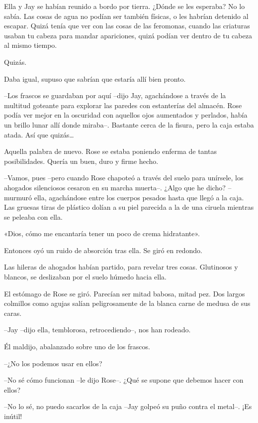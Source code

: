 {Ella y Jay se habían reunido a bordo por tierra. ¿Dónde se les
 esperaba? No lo sabía. Las cosas de agua no podían ser también físicas,
 o les habrían detenido al escapar. Quizá tenía que ver con las cosas de
 las feromonas, cuando las criaturas usaban tu cabeza para mandar
apariciones, quizá podían ver dentro de tu cabeza al mismo tiempo.}

{Quizás.}

{Daba igual, supuso que sabrían que estaría allí bien pronto.}

{--Los frascos se guardaban por aquí --dijo Jay, agachándose a través de
 la multitud goteante para explorar las paredes con estanterías del
 almacén. Rose podía ver mejor en la oscuridad con aquellos ojos
 aumentados y perlados, había un brillo lunar allí donde miraba--.
 Bastante cerca de la fisura, pero la caja estaba atada. Así que
 quizás\ldots{}}

{Aquella palabra de nuevo. Rose se estaba poniendo enferma de tantas
posibilidades. Quería un buen, duro y firme hecho.}

{--Vamos, pues --pero cuando Rose chapoteó a través del suelo para
 unírsele, los ahogados silenciosos cesaron en su marcha muerta--. ¿Algo
 que he dicho? --murmuró ella, agachándose entre los cuerpos pesados
 hasta que llegó a la caja. Las gruesas tiras de plástico dolían a su
piel parecida a la de una ciruela mientras se peleaba con ella.}

{«Dios, cómo me encantaría tener un poco de crema hidratante».}

{Entonces oyó un ruido de absorción tras ella. Se giró en redondo.}

{Las hileras de ahogados habían partido, para revelar tres cosas.
Glutinosos y blancos, se deslizaban por el suelo húmedo hacia ella.}

{El estómago de Rose se giró. Parecían ser mitad babosa, mitad pez. Dos
 largos colmillos como agujas salían peligrosamente de la blanca carne de
medusa de sus caras.}

{--Jay --dijo ella, temblorosa, retrocediendo--, nos han rodeado.}

{Él maldijo, abalanzado sobre uno de los frascos.}

{--¿No los podemos usar en ellos?}

{--No sé cómo funcionan --le dijo Rose--. ¿Qué se supone que debemos
hacer con ellos?}

{--No lo sé, no puedo sacarlos de la caja --Jay golpeó su puño contra el
metal--. ¡Es inútil!}

